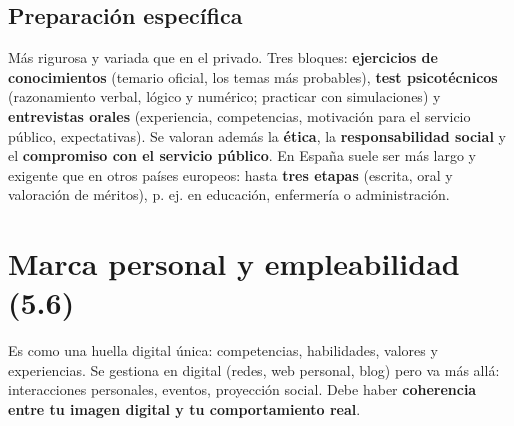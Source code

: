 \subsection*{Preparación específica}
Más rigurosa y variada que en el privado. Tres bloques: \textbf{ejercicios de conocimientos} (temario oficial, los temas más probables), \textbf{test psicotécnicos} (razonamiento verbal, lógico y numérico; practicar con simulaciones) y \textbf{entrevistas orales} (experiencia, competencias, motivación para el servicio público, expectativas). Se valoran además la \textbf{ética}, la \textbf{responsabilidad social} y el \textbf{compromiso con el servicio público}. En España suele ser más largo y exigente que en otros países europeos: hasta \textbf{tres etapas} (escrita, oral y valoración de méritos), p. ej. en educación, enfermería o administración.

\section{Marca personal y empleabilidad (5.6)}
Es como una huella digital única: competencias, habilidades, valores y experiencias. Se gestiona en digital (redes, web personal, blog) pero va más allá: interacciones personales, eventos, proyección social. Debe haber \textbf{coherencia entre tu imagen digital y tu comportamiento real}.

